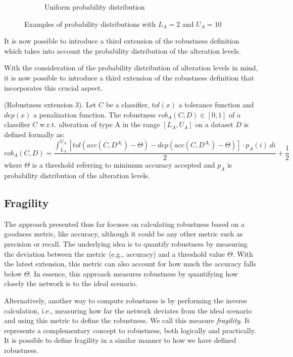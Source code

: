 \begin{figure}[h]
\begin{subfigure}{.33\textwidth}
		\caption{Uniform probability distribution}
		\label{fig:exp_prob}
	\end{subfigure}
	\caption{Examples of probability distributions with $L_A=2$ and $U_A=10$}
	\label{fig:prob_examp}
\end{figure}

It is now possible to introduce a third extension of the robustness definition which takes into account the probability distribution of the alteration levels. 

With the consideration of the probability distribution of alteration levels in mind, it is now possible to introduce a third extension of the robustness definition that incorporates this crucial aspect.

\begin{definition}\label{def:rob3} (Robustness extension 3).
	Let $C$ be a classifier, $tol(x)$ a tolerance function and $dep(x)$ a penalization function.
	The robustness $rob_A(C,D) \in [0,1]$ of a classifier $C$ w.r.t. alteration of type A in the range $[L_A, U_A]$ on a dataset $D$ is defined formally as:
	\[
	rob_A(C,D) = \frac{\int_{L_A}^{U_A} [tol(acc(C,D^{A_i}) - \Theta) - dep(acc(C,D^{A_i}) - \Theta)] \cdot p_A(i)\ di}{2} + \frac{1}{2}
	\]
	where $\Theta$ is a threshold referring to minimum accuracy accepted and $p_A$ is probability distribution of the alteration levels.
\end{definition}


\subsection{Fragility}

The approach presented thus far focuses on calculating robustness based on a goodness metric, like accuracy, although it could be any other metric such as precision or recall. The underlying idea is to quantify robustness by measuring the deviation between the metric (e.g., accuracy) and a threshold value $\Theta$. With the latest extension, this metric can also account for how much the accuracy falls below $\Theta$. In essence, this approach measures robustness by quantifying how closely the network is to the ideal scenario.

Alternatively, another way to compute robustness is by performing the inverse calculation, i.e., measuring how far the network deviates from the ideal scenario and using this metric to define the robustness. We call this measure \textit{fragility}. It represents a complementary concept to robustness, both logically and practically. It is possible to define fragility in a similar manner to how we have defined robustness.


